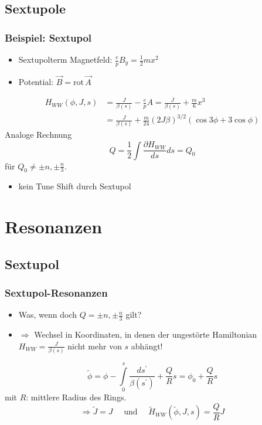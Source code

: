 \documentclass[hyperref={pdfpagelabels=false}]{beamer}
\begin{document}
\subsection{Sextupole}
\begin{frame}
\frametitle{Beispiel: Sextupol}
\begin{itemize}
\item Sextupolterm Magnetfeld: $\frac{e}{p} B_y = \frac{1}{2}m x^2$
\item Potential: $\vec{B} = \text{rot}\, \vec{A}$
\end{itemize}
\pause
\begin{align*}
H_{WW}(\phi,J,s) &= \frac{J}{\beta(s)} - \frac{e}{p}A= \frac{J}{\beta(s)} + \frac{m}{6}x^3 \\ &= \frac{J}{\beta(s)} + \frac{m}{24}(2J\beta)^{3/2}\left(\cos 3\phi + 3\cos \phi\right)
\end{align*}
\pause
Analoge Rechnung
\begin{equation*}
Q = \frac{1}{2} \int \frac{\partial H_{WW}}{ds} ds =  Q_0
\end{equation*}
für $Q_0 \neq \pm n,\pm \frac{n}{3}$.
\vspace*{.5cm}
\pause
\begin{itemize}
\item kein Tune Shift durch Sextupol
\end{itemize}
\end{frame}

\section{Resonanzen}
\subsection{Sextupol}
\begin{frame}
\frametitle{Sextupol-Resonanzen}
\begin{itemize}
\item Was, wenn doch $Q = \pm n,\pm \frac{n}{3}$ gilt?
\item $\Rightarrow$ Wechsel in Koordinaten, in denen der ungestörte Hamiltonian $H_{WW} = \frac{J}{\beta(s)}$ nicht mehr von $s$ abhängt!
\end{itemize}
\pause
\begin{equation*}
\tilde{\phi} = \phi - \int\limits_0^s \frac{ds^\prime}{\beta(s^\prime)} + \frac{Q}{R}s = \phi_0 + \frac{Q}{R}s
\end{equation*}
mit $R$: mittlere Radius des Rings.
\vspace*{.2cm}
\pause
\begin{equation*}
\Rightarrow \tilde{J} = J \quad \text{ und }\quad \tilde{H}_{WW}(\tilde{\phi},J,s) = \frac{Q}{R}J
\end{equation*}
\end{frame}
\end{document}
